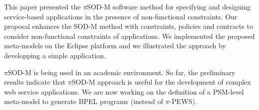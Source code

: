 This paper presented the $\pi$SOD-M software method for specifying and designing service-based applications in the presence of  non-functional constraints. 
Our proposal enhances the SOD-M method with constraints, policies and contracts  to consider non-functional constraints of applications.
We implemented the proposed meta-models on the Eclipse platform and we illustrated the approach by developping a simple application.

$\pi$SOD-M is being used in an academic environment.
So far, the preliminary results indicate that $\pi$SOD-M approach is useful for the development of complex web service applications. 
We are now working on the definition of a PSM-level meta-model to generate BPEL programs (instead of $\pi$-PEWS). 
